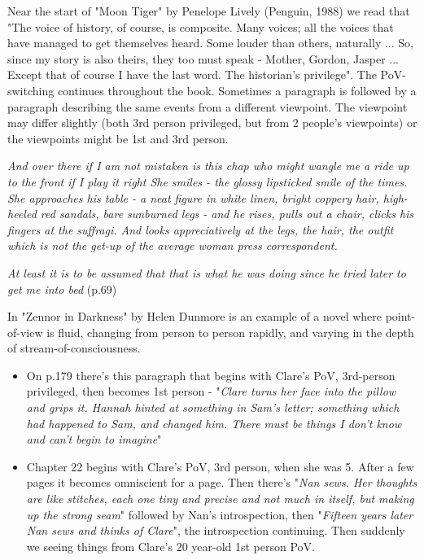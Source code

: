 \documentclass[11pt]{article}
\newenvironment{narrow}[2]{%
 \begin{list}{}{%
  \setlength{\topsep}{0pt}%
  \setlength{\leftmargin}{#1}%
  \setlength{\rightmargin}{#2}%
  \setlength{\listparindent}{\parindent}%
  \setlength{\itemindent}{\parindent}%
  \setlength{\parsep}{\parskip}%
 }%
\item[]}{\end{list}}
\begin{document}
Near the start of "Moon Tiger" by Penelope Lively (Penguin, 1988) we read that "The voice of history, of course, is composite. Many voices; all the voices that have managed to get themselves heard. Some louder than others, naturally ... So, since my story is also theirs, they too must speak - Mother, Gordon, Jasper ... Except that of course I have the last word. The historian's privilege". The PoV-switching continues throughout the book. Sometimes a paragraph is followed by a paragraph describing the same events from a different viewpoint. The viewpoint may differ slightly (both 3rd person privileged, but from 2 people's viewpoints) or the viewpoints might be 1st and 3rd person.
\begin{narrow}{1.0cm}{1.0cm}  
\textit{And over there if I am not mistaken is this chap who might wangle me a
 ride up to the front if I play it right She smiles - the glossy
 lipsticked smile of the times. She approaches his table - a neat
 figure in white linen, bright coppery hair, high-heeled red sandals,
 bare sunburned legs - and he rises, pulls out a chair, clicks his
 fingers at the suffragi.  And looks appreciatively at the legs, the
 hair, the outfit which is not the get-up of the average woman press
 correspondent.}

\textit{At least it is to be assumed that that is what he was doing since he
 tried later to get me into bed}
 (p.69)
\end{narrow}






In "Zennor in Darkness" by Helen Dunmore is an example of a novel where point-of-view is fluid, changing from person to person rapidly, and varying in the depth of stream-of-consciousness.


\begin{itemize}
\item On p.179 there's this paragraph that begins with Clare's PoV, 3rd-person privileged, then becomes 1st person - "\textit{Clare turns her face into the pillow and grips it. Hannah hinted at something in Sam's letter; something which had happened to Sam, and changed him. There must be things I don't know and can't begin to imagine}"

\item Chapter 22 begins with Clare's PoV, 3rd person, when she was 5. After a few pages it becomes omniscient for a page. Then there's "\textit{Nan sews. Her thoughts are like stitches, each one tiny and precise and not much in itself, but making up the strong seam}" followed by Nan's introspection, then "\textit{Fifteen years later Nan sews and thinks of Clare}", the introspection continuing. Then suddenly we seeing things from Clare's 20 year-old 1st person PoV.

\end{itemize}
\end{document}
